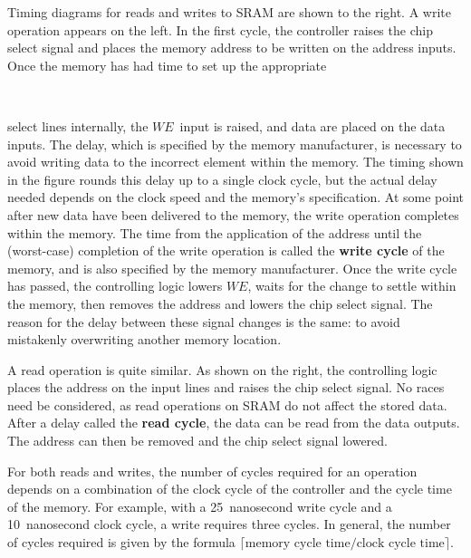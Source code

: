 \begin{minipage}{2.25in}
Timing diagrams for reads and writes
to SRAM are shown to the right.  A write operation
appears on the left.  In the first cycle, the controller raises the
chip select signal and places the memory address to be written on the
address inputs.  Once the memory has had time to set up the 
appropriate\linebreak
\end{minipage}\hspace{0.25in}%
\begin{minipage}{4in}
\\
\end{minipage}\mpdone

select lines
internally, the $WE$~input is raised, and data are placed
on the data inputs.  The delay, which is specified by the memory
manufacturer, is necessary to avoid writing data to the incorrect
element within the memory.  The timing shown in the
figure rounds this delay up to a single clock cycle, but the
actual delay needed depends on the clock speed and the memory's 
specification.  At some point after new data have been
delivered to the memory, the write operation completes within the
memory.  The time from the application of the address until the
(worst-case) completion of the write operation is called the {\bf
write cycle} of the memory, and is also specified by the memory 
manufacturer.  Once the write cycle has passed, the controlling logic 
lowers $WE$, waits for the change to settle within the memory,
then removes the address and lowers the chip select signal.  The
reason for the delay between these signal changes is the same: to 
avoid mistakenly overwriting another memory location.

A read operation is quite similar.  As shown on the right, the
controlling logic places the address on the input lines and raises the
chip select signal.  No races need be considered, as read operations
on SRAM do not affect the stored data.  After a delay called the {\bf
read cycle}, the data can be read from the data outputs.  The address
can then be removed and the chip select signal lowered.

For both reads and writes, the number of cycles required for an
operation depends on a combination of the clock cycle of the
controller and the cycle time of the memory.  For example, with a
25~nanosecond write cycle and a 10~nanosecond clock cycle, a write
requires three cycles.  In general, the number of cycles required is
given by the formula $\lceil\mbox{memory cycle time}/\mbox{clock cycle
time}\rceil$.\\

